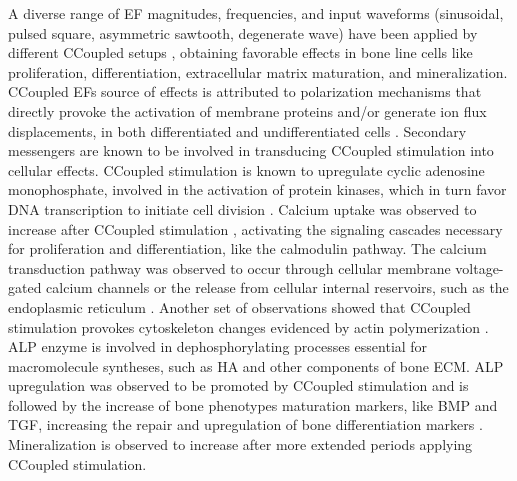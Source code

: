 A diverse range of \ac{EF} magnitudes, frequencies, and input waveforms (sinusoidal, pulsed square, asymmetric sawtooth, degenerate wave) have been applied by different \ac{CCoupled} setups \cite{Brighton1992-gg, Hartig2000-ny, Korenstein1984-qb}, obtaining favorable effects in bone line cells like proliferation, differentiation, extracellular matrix maturation, and mineralization. \ac{CCoupled} \ac{EF}s source of effects is attributed to polarization mechanisms that directly provoke the activation of membrane proteins and/or generate ion flux displacements, in both differentiated and undifferentiated cells \cite{Korenstein1984-qb, Danon1984-eu, Ozawa1989-uz}. Secondary messengers are known to be involved in transducing \ac{CCoupled} stimulation into cellular effects. \ac{CCoupled} stimulation is known to upregulate cyclic adenosine monophosphate, involved in the activation of protein kinases, which in turn favor \acs{DNA} transcription to initiate cell division \cite{Korenstein1984-qb}. Calcium uptake was observed to increase after \ac{CCoupled} stimulation \cite{Danon1984-eu}, activating the signaling cascades necessary for proliferation and differentiation, like the calmodulin pathway. The calcium transduction pathway was observed to occur through cellular membrane voltage-gated calcium channels or the release from cellular internal reservoirs, such as the endoplasmic reticulum \cite{Clark2014-sz, Brighton2001-fk}. Another set of observations showed that \ac{CCoupled} stimulation provokes cytoskeleton changes evidenced by actin polymerization \cite{Laub1984-qm, Binderman1984-og}. \acs{ALP} enzyme is involved in dephosphorylating processes essential for macromolecule syntheses, such as \ac{HA} and other components of bone \ac{ECM}. \acs{ALP} upregulation was observed to be promoted by \ac{CCoupled} stimulation and is followed by the increase of bone phenotypes maturation markers, like \acs{BMP} and \acs{TGF}, increasing the repair and upregulation of bone differentiation markers \cite{Clark2014-sz, Wang2006-hx}. Mineralization is observed to increase after more extended periods applying \ac{CCoupled} stimulation.    


